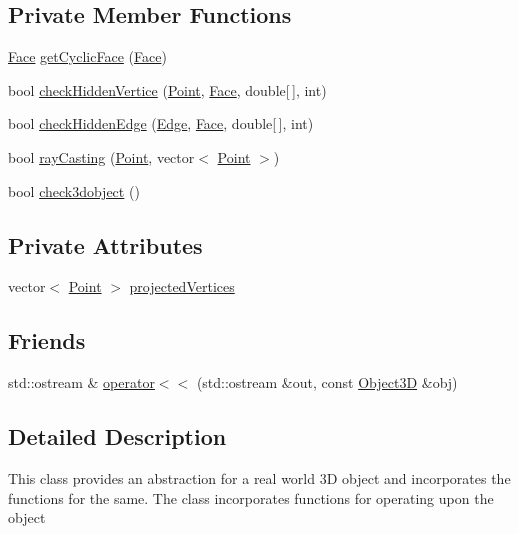 \subsection*{Private Member Functions}
\begin{DoxyCompactItemize}
\item 
\hyperlink{class_face}{Face} \hyperlink{class_object3_d_a1e7e47e01aeac572378c9ab645e93adb}{get\+Cyclic\+Face} (\hyperlink{class_face}{Face})
\item 
bool \hyperlink{class_object3_d_a2ec1e4c1198f44794b3c3a1c72f6143d}{check\+Hidden\+Vertice} (\hyperlink{class_point}{Point}, \hyperlink{class_face}{Face}, double\mbox{[}$\,$\mbox{]}, int)
\item 
bool \hyperlink{class_object3_d_a2bc5ce361addc05302a078ada575261d}{check\+Hidden\+Edge} (\hyperlink{class_edge}{Edge}, \hyperlink{class_face}{Face}, double\mbox{[}$\,$\mbox{]}, int)
\item 
bool \hyperlink{class_object3_d_a026c35f9fcf1f58f4d48c18ab26d7712}{ray\+Casting} (\hyperlink{class_point}{Point}, vector$<$ \hyperlink{class_point}{Point} $>$)
\item 
bool \hyperlink{class_object3_d_a37f6e1bb07f45453a09a92b1238006c8}{check3dobject} ()
\end{DoxyCompactItemize}
\subsection*{Private Attributes}
\begin{DoxyCompactItemize}
\item 
vector$<$ \hyperlink{class_point}{Point} $>$ \hyperlink{class_object3_d_a40518019f2d67c105a32d218e38a0d4f}{projected\+Vertices}
\end{DoxyCompactItemize}
\subsection*{Friends}
\begin{DoxyCompactItemize}
\item 
std\+::ostream \& \hyperlink{class_object3_d_aadcfd04a104ea0b7ee94d707ca4a0143}{operator$<$$<$} (std\+::ostream \&out, const \hyperlink{class_object3_d}{Object3D} \&obj)
\end{DoxyCompactItemize}


\subsection{Detailed Description}
This class provides an abstraction for a real world 3D object and incorporates the functions for the same. The class incorporates functions for operating upon the object 

